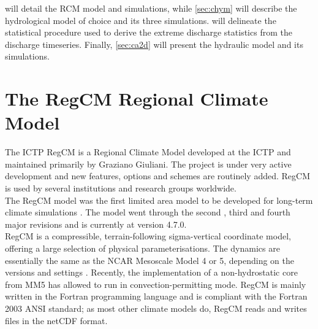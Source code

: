  will detail the RCM model and simulations, while \cref{sec:chym} will describe the hydrological model of choice and its three simulations.
 will delineate the statistical procedure used to derive the extreme discharge statistics from the discharge timeseries. Finally, \cref{sec:ca2d} will present the hydraulic model and its simulations.



\section{The RegCM Regional Climate Model} \label{sec:regcm}
The ICTP RegCM is a Regional Climate Model developed at the ICTP and maintained primarily by Graziano Giuliani. The project is under very active development and new features, options and schemes are routinely added. RegCM is used by several institutions and research groups worldwide.\\
The RegCM model was the first limited area model to be developed for long-term climate simulations \citep{dickinson1989regional, Giorgi1989}. The model went through the second \citep{Giorgi1993}, third \citep{Pal2007} and fourth \citep{giorgi2012RegmoddespretesovemulCORdom} major revisions and is currently at version 4.7.0.\\
RegCM is a compressible, terrain-following sigma-vertical coordinate model, offering a large selection of physical parameterisations. The dynamics are essentially the same as the NCAR Mesoscale Model 4 or 5, depending on the versions and settings \citep[MM4, MM5,][]{Grell1994}.
Recently, the implementation of a non-hydrostatic core from MM5 has allowed to run in convection-permitting mode.
RegCM is mainly written in the Fortran programming language and is compliant with the Fortran 2003 ANSI standard; as most other climate models do, RegCM reads and writes files in the netCDF format.


